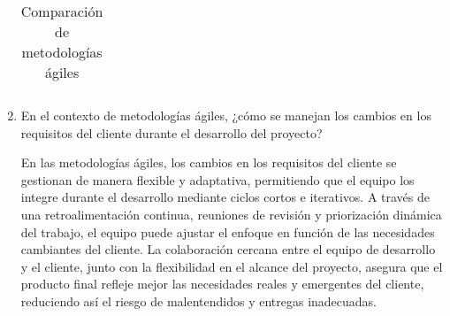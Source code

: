\begin{enumerate}
\begin{table}[h!]
\begin{tabular}{|p{}|p{}|p{}|p{}|p{}|}
                    \hline
                \end{tabular}
                \caption{Comparación de metodologías ágiles}
            \end{table}

        \item En el contexto de metodologías ágiles, ¿cómo se manejan los cambios en los
            requisitos del cliente durante el desarrollo del proyecto?

            En las metodologías ágiles, los cambios en los requisitos del cliente se gestionan
            de manera flexible y adaptativa, permitiendo que el equipo los integre durante
            el desarrollo mediante ciclos cortos e iterativos. A través de una retroalimentación
            continua, reuniones de revisión y priorización dinámica del trabajo, el equipo
            puede ajustar el enfoque en función de las necesidades cambiantes del cliente.
            La colaboración cercana entre el equipo de desarrollo y el cliente, junto con la
            flexibilidad en el alcance del proyecto, asegura que el producto final refleje
            mejor las necesidades reales y emergentes del cliente, reduciendo así el riesgo
            de malentendidos y entregas inadecuadas.
    \end{enumerate}


    \nocite{*} %

    \clearpage
    

    
